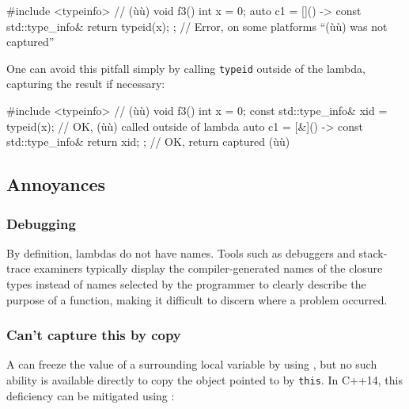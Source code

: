 \begin{emcppslisting}
#include <typeinfo>  // (ù{}ù)
void f3()
{
    int x = 0;
    auto c1 = []() -> const std::type_info& { return typeid(x); };
        // Error, on some platforms ``(ù{}ù) was not captured''
}
\end{emcppslisting}
    

\noindent One can avoid this pitfall simply by calling \lstinline!typeid! outside of
the lambda, capturing the result if necessary:

\begin{emcppslisting}
#include <typeinfo>  // (ù{}ù)
void f3()
{
    int x = 0;
    const std::type_info& xid = typeid(x);
        // OK, (ù{}ù) called outside of lambda
    auto c1 = [&]() -> const std::type_info& { return xid; };
        // OK, return captured (ù{}ù)
}
\end{emcppslisting}
    

\subsection[Annoyances]{Annoyances}\label{annoyances}

\subsubsection[Debugging]{Debugging}\label{debugging}

By definition, lambdas do not have names. Tools such as debuggers and
stack-trace examiners typically display the compiler-generated names of
the closure types instead of names selected by the programmer to clearly
describe the purpose of a function, making it difficult to discern where
a problem occurred.

\subsubsection[Can’t capture \lstinline!*this! by copy]{Can’t capture {\SubsubsecCode *this} by copy}\label{can’t-capture-*this-by-copy}

A  can freeze the value of a surrounding local
variable by using , but no such ability is
available directly to copy the object pointed to by \lstinline!this!. In
C++14, this deficiency can be mitigated using :

